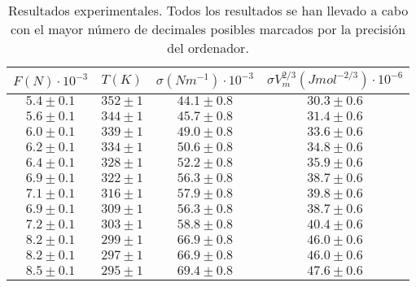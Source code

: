 \begin{table*}[t]
	\centering
		\begin{tabular}{cccc}
			\toprule
$F (N) \cdot 10^{-3}$   &   $T (K)$   &   $\sigma (Nm^{-1}) \cdot 10^{-3}$   &   $\sigma V_{m}^{2/3} (Jmol^{-2/3}) \cdot 10^{-6}$ \\
\midrule
$5.4 \pm 0.1$   &   $352 \pm 1$   &   $44.1 \pm 0.8$   &   $30.3 \pm 0.6$  \\
$5.6 \pm 0.1$   &   $344 \pm 1$   &   $45.7 \pm 0.8$   &   $31.4 \pm 0.6$  \\
$6.0 \pm 0.1$   &   $339 \pm 1$   &   $49.0 \pm 0.8$   &   $33.6 \pm 0.6$  \\
$6.2 \pm 0.1$   &   $334 \pm 1$   &   $50.6 \pm 0.8$   &   $34.8 \pm 0.6$  \\
$6.4 \pm 0.1$   &   $328 \pm 1$   &   $52.2 \pm 0.8$   &   $35.9 \pm 0.6$  \\
$6.9 \pm 0.1$   &   $322 \pm 1$   &   $56.3 \pm 0.8$   &   $38.7 \pm 0.6$  \\
$7.1 \pm 0.1$   &   $316 \pm 1$   &   $57.9 \pm 0.8$   &   $39.8 \pm 0.6$  \\
$6.9 \pm 0.1$   &   $309 \pm 1$   &   $56.3 \pm 0.8$   &   $38.7 \pm 0.6$  \\
$7.2 \pm 0.1$   &   $303 \pm 1$   &   $58.8 \pm 0.8$   &   $40.4 \pm 0.6$  \\
$8.2 \pm 0.1$   &   $299 \pm 1$   &   $66.9 \pm 0.8$   &   $46.0 \pm 0.6$  \\
$8.2 \pm 0.1$   &   $297 \pm 1$   &   $66.9 \pm 0.8$   &   $46.0 \pm 0.6$  \\
$8.5 \pm 0.1$   &   $295 \pm 1$   &   $69.4 \pm 0.8$   &   $47.6 \pm 0.6$  \\
			\bottomrule
		\end{tabular}
		\caption{Resultados experimentales. Todos los resultados se han llevado a cabo con el mayor número de decimales posibles marcados por la precisión del ordenador.}
		\label{table_exp}
\end{table*}